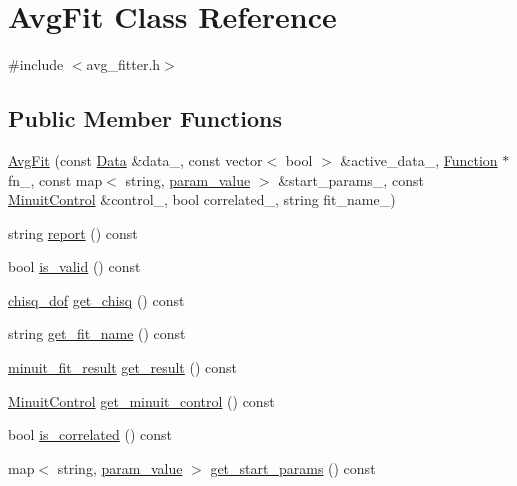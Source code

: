 \hypertarget{classAvgFit}{}\section{Avg\+Fit Class Reference}
\label{classAvgFit}


{\ttfamily \#include $<$avg\+\_\+fitter.\+h$>$}

\subsection*{Public Member Functions}
\begin{DoxyCompactItemize}
\item 
\mbox{\hyperlink{classAvgFit_a578a5426ad4b8bf8caea1dad68b014ac}{Avg\+Fit}} (const \mbox{\hyperlink{classData}{Data}} \&data\+\_\+, const vector$<$ bool $>$ \&active\+\_\+data\+\_\+, \mbox{\hyperlink{classFunction}{Function}} $\ast$fn\+\_\+, const map$<$ string, \mbox{\hyperlink{structparam__value}{param\+\_\+value}} $>$ \&start\+\_\+params\+\_\+, const \mbox{\hyperlink{structMinuitControl}{Minuit\+Control}} \&control\+\_\+, bool correlated\+\_\+, string fit\+\_\+name\+\_\+)
\item 
string \mbox{\hyperlink{classAvgFit_a78ac6ba410c7f44b543e3b7202e046ca}{report}} () const
\item 
bool \mbox{\hyperlink{classAvgFit_a9a906abeb09e724f98fc8b77aff0ea6d}{is\+\_\+valid}} () const
\item 
\mbox{\hyperlink{structchisq__dof}{chisq\+\_\+dof}} \mbox{\hyperlink{classAvgFit_ad4b8b6e5bf145cbeb62b02787612f226}{get\+\_\+chisq}} () const
\item 
string \mbox{\hyperlink{classAvgFit_af9fc84ffb95d3b08daa27ee377892537}{get\+\_\+fit\+\_\+name}} () const
\item 
\mbox{\hyperlink{structminuit__fit__result}{minuit\+\_\+fit\+\_\+result}} \mbox{\hyperlink{classAvgFit_a2d288928c4cf2f92ee28fce2503da979}{get\+\_\+result}} () const
\item 
\mbox{\hyperlink{structMinuitControl}{Minuit\+Control}} \mbox{\hyperlink{classAvgFit_a2a1fb43d6a70a74e39d7d05de9fe5e5d}{get\+\_\+minuit\+\_\+control}} () const
\item 
bool \mbox{\hyperlink{classAvgFit_af828c76e39fea9326e2828e176abb1c4}{is\+\_\+correlated}} () const
\item 
map$<$ string, \mbox{\hyperlink{structparam__value}{param\+\_\+value}} $>$ \mbox{\hyperlink{classAvgFit_a7823eaaddd8f06848f2c092886076d0d}{get\+\_\+start\+\_\+params}} () const
\item 

\end{DoxyCompactItemize}

